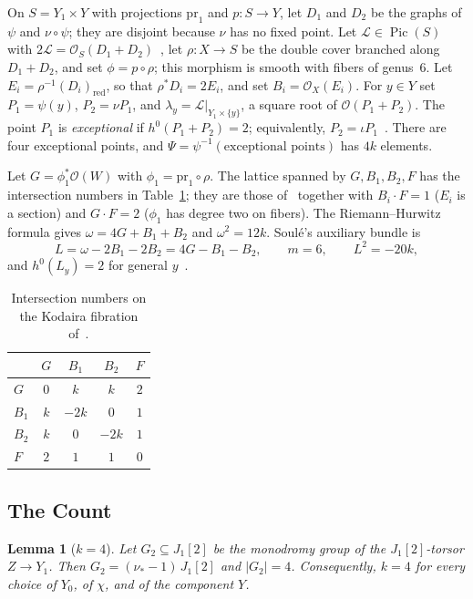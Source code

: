 \documentclass[11pt]{article}
\newtheorem{lemma}[theorem]{Lemma}
\theoremstyle{definition}
\theoremstyle{remark}
\DeclareMathOperator{\Pic}{Pic}
\newcommand{\OO}{\mathcal{O}}
\newcommand{\cL}{\mathcal{L}}
\begin{document}
On $S=Y_1\times Y$ with projections $\mathrm{pr}_1$ and $p\colon S\to Y$, let
$D_1$ and $D_2$ be the graphs of $\psi$ and $\nu\circ\psi$; they are disjoint
because $\nu$ has no fixed point. Let $\cL\in\Pic(S)$ with
$2\cL=\OO_S(D_1+D_2)$~\cite{MD85}, let $\rho\colon X\to S$ be the double cover
branched along $D_1+D_2$, and set $\phi=p\circ\rho$; this morphism is smooth with
fibers of genus~$6$. Let $E_i=\rho^{-1}(D_i)_{\mathrm{red}}$, so that
$\rho^*D_i=2E_i$, and set $B_i=\OO_X(E_i)$. For $y\in Y$ set $P_1=\psi(y)$,
$P_2=\nu P_1$, and $\lambda_y=\cL|_{Y_1\times\{y\}}$, a square root of
$\OO(P_1+P_2)$. The point $P_1$ is \emph{exceptional} if $h^0(P_1+P_2)=2$;
equivalently, $P_2=\iota P_1$~\cite[Prop.~5\,iii)]{So26}. There are four
exceptional points, and $\Psi=\psi^{-1}(\text{exceptional points})$ has $4k$
elements.

Let $G=\phi_1^*\OO(W)$ with $\phi_1=\mathrm{pr}_1\circ\rho$. The lattice spanned
by $G,B_1,B_2,F$ has the intersection numbers in Table~\ref{tab:lattice}; they
are those of~\cite[Prop.~8]{So26} together with $B_i\cdot F=1$ ($E_i$ is a
section) and $G\cdot F=2$ ($\phi_1$ has degree two on fibers). The
Riemann--Hurwitz formula gives $\omega=4G+B_1+B_2$ and $\omega^2=12k$. Soul\'e's
auxiliary bundle is
\[
L=\omega-2B_1-2B_2=4G-B_1-B_2,\qquad m=6,\qquad L^2=-20k,
\]
and $h^0(L_y)=2$ for general $y$~\cite[Prop.~9\,ii), iii), v)]{So26}.

\begin{table}[ht]
\centering
\begin{tabular}{@{}lcccc@{}}
\toprule
 & $G$ & $B_1$ & $B_2$ & $F$\\
\midrule
$G$ & $0$ & $k$ & $k$ & $2$\\
$B_1$ & $k$ & $-2k$ & $0$ & $1$\\
$B_2$ & $k$ & $0$ & $-2k$ & $1$\\
$F$ & $2$ & $1$ & $1$ & $0$\\
\bottomrule
\end{tabular}
\caption{Intersection numbers on the Kodaira fibration of~\cite{So26}.}
\label{tab:lattice}
\end{table}

\subsection{The Count}

\begin{lemma}[$k=4$]\label{lem:k4}
Let $G_2\subseteq J_1[2]$ be the monodromy group of the $J_1[2]$-torsor $Z\to Y_1$.
Then $G_2=(\nu_*-1)\,J_1[2]$ and $|G_2|=4$. Consequently, $k=4$ for every choice
of $Y_0$, of $\chi$, and of the component $Y$.
\end{lemma}
\end{document}
